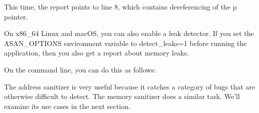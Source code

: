 This time, the report points to line 8, which contains dereferencing of the p pointer.

On x86\_64 Linux and macOS, you can also enable a leak detector. If you set the ASAN\_OPTIONS environment variable to detect\_leaks=1 before running the application, then you also get a report about memory leaks.

On the command line, you can do this as follows:


The address sanitizer is very useful because it catches a category of bugs that are otherwise difficult to detect. The memory sanitizer does a similar task. We’ll examine its use cases in the next section.




















